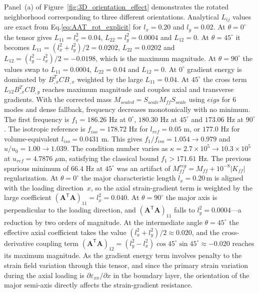\documentclass[final,3p,times,fleqn]{elsarticle}
\newcommand{\rev}[1]{\textcolor{revcolor}{#1}}
\begin{document}
Panel~(a) of Figure~\ref{fig:3D_orientation_effect} demonstrates the 
rotated neighborhood corresponding to three different orientations.
\rev{Analytical $L_{ij}$ values are exact from Eq.\ref{eq:AAT_rot_explicit} for $l_x=0.20$ and $l_y=0.02$. At $\theta=0^\circ$ the tensor gives $L_{11}=l_x^2=0.04$, $L_{22}=l_y^2=0.0004$ and $L_{12}=0$. At $\theta=45^\circ$ it becomes $L_{11}=(l_x^2+l_y^2)/2=0.0202$, $L_{22}=0.0202$ and $L_{12}=(l_y^2-l_x^2)/2=-0.0198$, which is the maximum magnitude. At $\theta=90^\circ$ the values swap to $L_{11}=0.0004$, $L_{22}=0.04$ and $L_{12}=0$. At $0^\circ$ gradient energy is dominated by $B_{,x}^T C B_{,x}$ weighted by the large $L_{11}=0.04$. At $45^\circ$ the cross term $L_{12} B_{,x}^T C B_{,y}$ reaches maximum magnitude and couples axial and transverse gradients. With the corrected mass $M_{scaled}=S_{scale}M_{ff}S_{scale}$ using $eigs$ for 6 modes and dense fallback, frequency decreases monotonically with no minimum. The first frequency is $f_1=186.26$ Hz at $0^\circ$, $180.30$ Hz at $45^\circ$ and $173.06$ Hz at $90^\circ$. The isotropic reference is $f_{iso}=178.72$ Hz for $l_{ref}=0.05$ m, or $177.0$ Hz for volume-equivalent $l_{iso}=0.0431$ m. This gives $f_1/f_{iso}=1.054\to0.979$ and $u/u_0=1.00\to1.039$. The condition number varies as $\kappa=2.7\times10^5\to10.3\times10^5$ at $u_{ref}=4.7876$ $\mu$m, satisfying the classical bound $f_1>171.61$ Hz. The previous spurious minimum of $66.4$ Hz at $45^\circ$ was an artifact of $M_{ff}^{reg}=M_{ff}+10^{-8}|K_{ff}|$ regularization.}
At $\theta = 0^{\circ}$ the major characteristic length $l_{x} = 0.20$\,m is
aligned with the loading direction~$x$, so the axial strain-gradient
term is weighted by the large coefficient
$(\mathbf{A}^{\mathsf{T}}\mathbf{A})_{11} = l_{x}^{2} = 0.040$.
At $\theta = 90^{\circ}$ the major axis is perpendicular to the loading
direction, and $(\mathbf{A}^{\mathsf{T}}\mathbf{A})_{11}$ falls to
$l_{y}^{2} = 0.0004$---a reduction by two orders of magnitude.
At the intermediate angle $\theta = 45^{\circ}$ the effective axial
coefficient takes the value
$(l_{x}^{2}+l_{y}^{2})/2 \approx 0.020$, and the cross-derivative
coupling term
$(\mathbf{A}^{\mathsf{T}}\mathbf{A})_{12}
= (l_{y}^{2}-l_{x}^{2})\cos 45^{\circ}\sin 45^{\circ}
\approx -0.020$
reaches its maximum magnitude.
As the gradient energy term involves penalty to the strain field
variation through this tensor, and since the primary strain variation
during the axial loading is $\partial \varepsilon_{xx} / \partial x$ in the
boundary layer, the orientation of the major semi-axis directly
affects the strain-gradient resistance.
\end{document}
